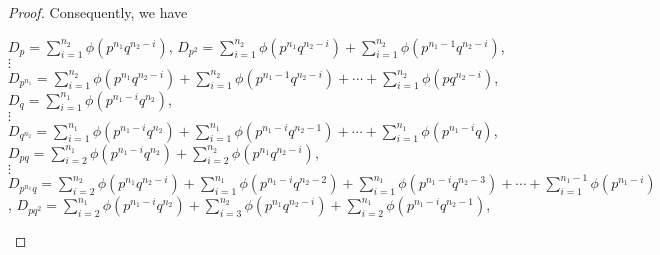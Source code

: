 \documentclass{amsart}
\theoremstyle{plain}
\theoremstyle{definition}
\theoremstyle{remark}
\begin{document}
\begin{proof}
 Consequently, we have
\begin{center}
$D_ p = \sum \limits_{i=1}^{n_2}\phi(p^{n_1}q^{n_2-i})$,
$D_{p^2} = \sum \limits_{i=1}^{n_2}\phi(p^{n_1}q^{n_2-i}) + \sum \limits_{i=1}^{n_2}\phi(p^{n_1-1}q^{n_2-i})$, \\

$\vdots$\\

$D_{p^{n_1}} = \sum \limits_{i=1}^{n_2} \phi(p^{n_1}q^{n_2-i})+ \sum \limits_{i=1}^{n_2}\phi(p^{n_1-1}q^{n_2-i}) + \cdots + \sum \limits_{i=1}^{n_2}\phi(pq^{n_2-i})$, \\

$D_q = \sum \limits_{i=1}^{n_1}\phi(p^{n_1-i}q^{n_2})$,\\

$\vdots$\\

$D_{q^{n_2}} = \sum \limits_{i=1}^{n_1} \phi(p^{n_1-i}q^{n_2})+ \sum \limits_{i=1}^{n_1}\phi(p^{n_1-i}q^{n_2-1}) + \cdots + \sum \limits_{i=1}^{n_1}\phi(p^{n_1-i}q)$, $D_{pq} = \sum \limits_{i=2}^{n_1}\phi(p^{n_1-i}q^{n_2})+ \sum \limits_{i=2}^{n_2}\phi(p^{n_1}q^{n_2-i})$, \\

$\vdots$\\

$D_{p^{n_1}q} = \sum \limits_{i=2}^{n_2}\phi(p^{n_1}q^{n_2-i}) + \sum \limits_{i=1}^{n_1}\phi(p^{n_1-i}q^{n_2-2}) + \sum \limits_{i=1}^{n_1}\phi(p^{n_1-i}q^{n_2-3})+ \cdots + \sum \limits_{i=1}^{n_1-1}\phi(p^{n_1-i})$, $D_{pq^2} = \sum \limits_{i=2}^{n_1}\phi(p^{n_1-i}q^{n_2})+ \sum \limits_{i=3}^{n_2}\phi(p^{n_1}q^{n_2-i}) + \sum \limits_{i=2}^{n_1}\phi(p^{n_1-i}q^{n_2-1})$,\\


\end{center}
\end{proof}
\end{document}
